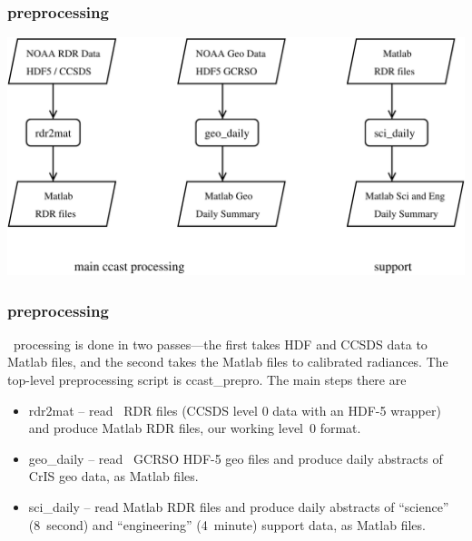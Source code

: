 \documentclass[11pt]{beamer}
\begin{document}
\begin{frame}
\frametitle{preprocessing}

\begin{center}
  \includegraphics[scale=0.4]{figures/prepro.pdf}
\end{center}

\end{frame}
\begin{frame}
\frametitle{preprocessing}

\ccast\ processing is done in two passes---the first takes HDF and
CCSDS data to Matlab files, and the second takes the Matlab files 
to calibrated radiances.  The top-level preprocessing script is
ccast\_prepro.  The main steps there are

\begin{itemize}
  \item rdr2mat -- read \noaa\ RDR files (CCSDS level 0 data with an
    HDF-5 wrapper) and produce Matlab RDR files, our working level~0
    format.

  \item geo\_daily -- read \noaa\ GCRSO HDF-5 geo files and produce
    daily abstracts of CrIS geo data, as Matlab files.

  \item sci\_daily -- read Matlab RDR files and produce daily
    abstracts of ``science'' (8~second) and ``engineering''
    (4~minute) support data, as Matlab files.

\end{itemize}

\end{frame}
\end{document}
